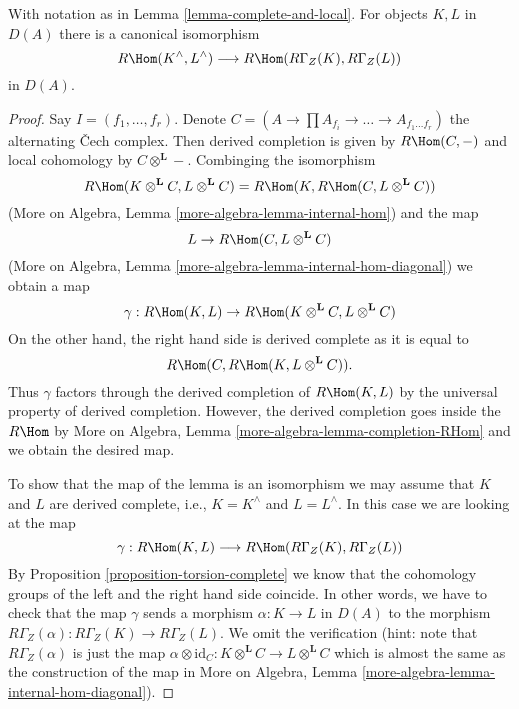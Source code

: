 \begin{lemma}
\label{lemma-compare-RHom}
With notation as in Lemma \ref{lemma-complete-and-local}.
For objects $K, L$ in $D(A)$ there is a canonical isomorphism
$$
R\Hom(K^\wedge, L^\wedge) \longrightarrow R\Hom(R\Gamma_Z(K), R\Gamma_Z(L))
$$
in $D(A)$.
\end{lemma}

\begin{proof}
Say $I = (f_1, \ldots, f_r)$. Denote
$C = (A \to \prod A_{f_i} \to \ldots \to A_{f_1 \ldots f_r})$ the
alternating {\v C}ech complex. Then derived completion is given
by $R\Hom(C, -)$ and local cohomology by $C \otimes^\mathbf{L} -$.
Combinging the isomorphism
$$
R\Hom(K \otimes^\mathbf{L} C, L \otimes^\mathbf{L} C) =
R\Hom(K, R\Hom(C,  L \otimes^\mathbf{L} C))
$$
(More on Algebra, Lemma \ref{more-algebra-lemma-internal-hom})
and the map
$$
L \to R\Hom(C,  L \otimes^\mathbf{L} C)
$$
(More on Algebra, Lemma \ref{more-algebra-lemma-internal-hom-diagonal})
we obtain a map
$$
\gamma : R\Hom(K, L) \to R\Hom(K \otimes^\mathbf{L} C, L \otimes^\mathbf{L} C)
$$
On the other hand, the right hand side is derived complete as it is
equal to
$$
R\Hom(C, R\Hom(K, L \otimes^\mathbf{L} C)).
$$
Thus $\gamma$ factors through the derived completion of
$R\Hom(K, L)$ by the universal property of derived completion.
However, the derived completion goes inside the $R\Hom$ by
More on Algebra, Lemma \ref{more-algebra-lemma-completion-RHom}
and we obtain the desired map.

\medskip\noindent
To show that the map of the lemma is an isomorphism
we may assume that $K$ and $L$ are derived complete, i.e.,
$K = K^\wedge$ and $L = L^\wedge$. In this case we are
looking at the map
$$
\gamma : R\Hom(K, L) \longrightarrow R\Hom(R\Gamma_Z(K), R\Gamma_Z(L))
$$
By Proposition \ref{proposition-torsion-complete} we know that
the cohomology groups
of the left and the right hand side coincide. In other words,
we have to check that the map $\gamma$ sends a morphism
$\alpha : K \to L$ in $D(A)$ to the morphism
$R\Gamma_Z(\alpha) : R\Gamma_Z(K) \to R\Gamma_Z(L)$.
We omit the verification (hint: note that $R\Gamma_Z(\alpha)$
is just the map
$\alpha \otimes \text{id}_C :
K \otimes^\mathbf{L} C
\to
L \otimes^\mathbf{L} C$ which is almost the same as the
construction of the map in
More on Algebra, Lemma \ref{more-algebra-lemma-internal-hom-diagonal}).
\end{proof}







